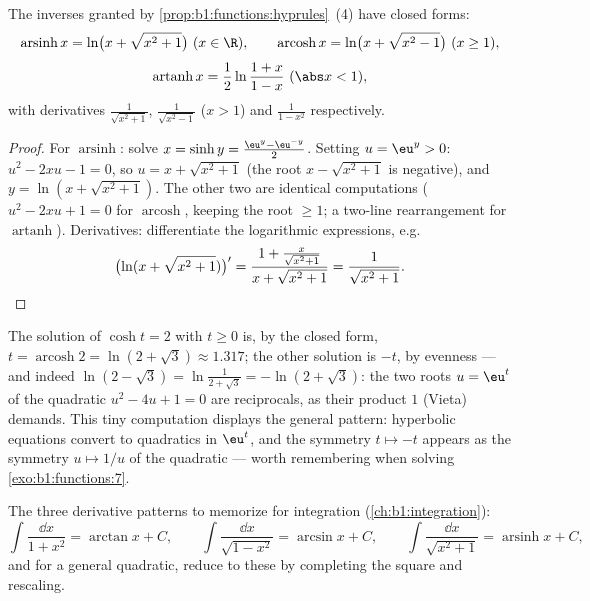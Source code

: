 \begin{proposition}\label{prop:b1:functions:invhyp}
The inverses granted by \cref{prop:b1:functions:hyprules}~(4) have
closed forms:
\[
\operatorname{arsinh} x = \ln\bigl(x + \sqrt{x^2 + 1}\bigr)
\ (x \in \R),
\qquad
\operatorname{arcosh} x = \ln\bigl(x + \sqrt{x^2 - 1}\bigr)
\ (x \geq 1),
\]
\[
\operatorname{artanh} x = \frac 12 \ln\frac{1 + x}{1 - x}
\ (\abs x < 1),
\]
with derivatives $\frac{1}{\sqrt{x^2+1}}$, $\frac{1}{\sqrt{x^2-1}}$
($x > 1$) and $\frac{1}{1 - x^2}$ respectively.
\end{proposition}

\begin{proof}
For $\operatorname{arsinh}$: solve $x = \sinh y = \frac{\eu^y -
\eu^{-y}}{2}$. Setting $u = \eu^y > 0$: $u^2 - 2xu - 1 = 0$, so $u = x
+ \sqrt{x^2 + 1}$ (the root $x - \sqrt{x^2+1}$ is negative), and $y =
\ln(x + \sqrt{x^2+1})$. The other two are identical computations
($u^2 - 2xu + 1 = 0$ for $\operatorname{arcosh}$, keeping the root
$\geq 1$; a two-line rearrangement for $\operatorname{artanh}$).
Derivatives: differentiate the logarithmic expressions, e.g.
\[
\bigl(\ln(x + \sqrt{x^2+1})\bigr)'
= \frac{1 + \frac{x}{\sqrt{x^2+1}}}{x + \sqrt{x^2+1}}
= \frac{1}{\sqrt{x^2 + 1}} . \qedhere
\]
\end{proof}

\begin{example}\label{ex:b1:functions:arcoshtwo}
The solution of $\cosh t = 2$ with $t \geq 0$ is, by the closed
form, $t = \operatorname{arcosh} 2 = \ln(2 + \sqrt3) \approx
1.317$; the other solution is $-t$, by evenness --- and indeed
$\ln(2 - \sqrt3) = \ln\frac1{2 + \sqrt3} = -\ln(2 + \sqrt3)$: the
two roots $u = \eu^t$ of the quadratic $u^2 - 4u + 1 = 0$ are
reciprocals, as their product $1$ (Vieta) demands. This tiny
computation displays the general pattern: hyperbolic equations
convert to quadratics in $\eu^t$, and the symmetry $t \mapsto -t$
appears as the symmetry $u \mapsto 1/u$ of the quadratic ---
worth remembering when solving \cref{exo:b1:functions:7}.
\end{example}

\begin{method}\label{met:b1:functions:primitive}
The three derivative patterns to memorize for integration
(\cref{ch:b1:integration}):
\[
\int \frac{\dd x}{1 + x^2} = \arctan x + C,
\qquad
\int \frac{\dd x}{\sqrt{1 - x^2}} = \arcsin x + C,
\qquad
\int \frac{\dd x}{\sqrt{x^2 + 1}} = \operatorname{arsinh} x + C,
\]
and for a general quadratic, reduce to these by completing the square
and rescaling.
\end{method}

